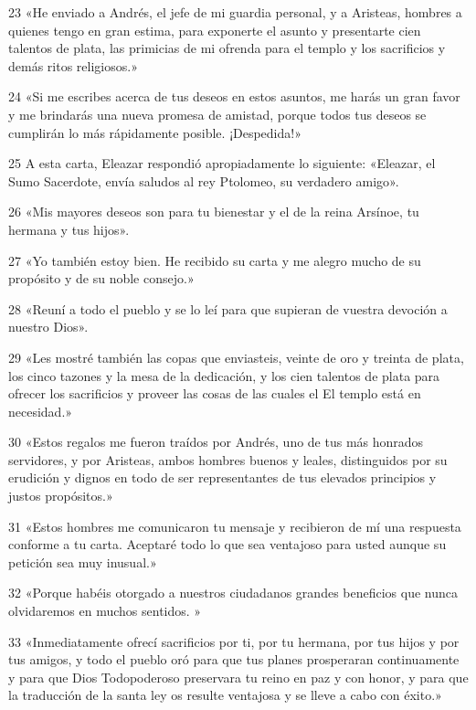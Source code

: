 \par 23 «He enviado a Andrés, el jefe de mi guardia personal, y a Aristeas, hombres a quienes tengo en gran estima, para exponerte el asunto y presentarte cien talentos de plata, las primicias de mi ofrenda para el templo y los sacrificios y demás ritos religiosos.»

\par 24 «Si me escribes acerca de tus deseos en estos asuntos, me harás un gran favor y me brindarás una nueva promesa de amistad, porque todos tus deseos se cumplirán lo más rápidamente posible. ¡Despedida!»

\par 25 A esta carta, Eleazar respondió apropiadamente lo siguiente: «Eleazar, el Sumo Sacerdote, envía saludos al rey Ptolomeo, su verdadero amigo».

\par 26 «Mis mayores deseos son para tu bienestar y el de la reina Arsínoe, tu hermana y tus hijos».

\par 27 «Yo también estoy bien. He recibido su carta y me alegro mucho de su propósito y de su noble consejo.»

\par 28 «Reuní a todo el pueblo y se lo leí para que supieran de vuestra devoción a nuestro Dios».

\par 29 «Les mostré también las copas que enviasteis, veinte de oro y treinta de plata, los cinco tazones y la mesa de la dedicación, y los cien talentos de plata para ofrecer los sacrificios y proveer las cosas de las cuales el El templo está en necesidad.»

\par 30 «Estos regalos me fueron traídos por Andrés, uno de tus más honrados servidores, y por Aristeas, ambos hombres buenos y leales, distinguidos por su erudición y dignos en todo de ser representantes de tus elevados principios y justos propósitos.»

\par 31 «Estos hombres me comunicaron tu mensaje y recibieron de mí una respuesta conforme a tu carta. Aceptaré todo lo que sea ventajoso para usted aunque su petición sea muy inusual.»

\par 32 «Porque habéis otorgado a nuestros ciudadanos grandes beneficios que nunca olvidaremos en muchos sentidos.
»
\par 33 «Inmediatamente ofrecí sacrificios por ti, por tu hermana, por tus hijos y por tus amigos, y todo el pueblo oró para que tus planes prosperaran continuamente y para que Dios Todopoderoso preservara tu reino en paz y con honor, y para que la traducción de la santa ley os resulte ventajosa y se lleve a cabo con éxito.»

